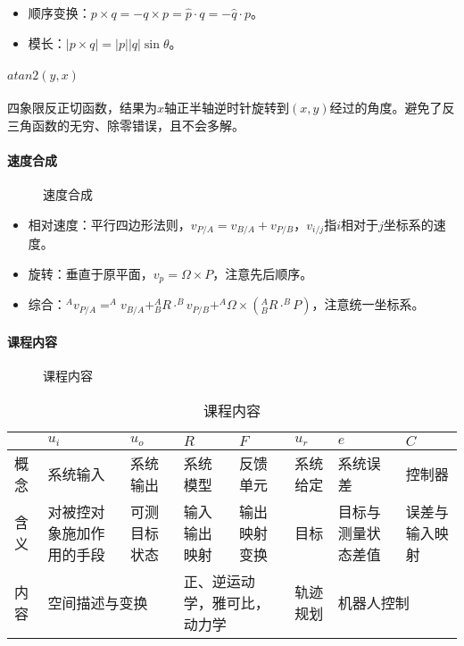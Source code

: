 \documentclass[
12pt, %
a4paper, 
oneside, %
headinclude,footinclude, %
]{scrartcl}
\begin{document}
\begin{itemize}
\item 顺序变换：$ p \times q = -q \times p = \hat{p} \cdot q = -\hat{q} \cdot p $。
\item 模长：$ |p \times q| = |p||q|\sin\theta $。
\end{itemize}
\paragraph{$ atan2(y, x) $}
四象限反正切函数，结果为$ x $轴正半轴逆时针旋转到$ (x, y) $经过的角度。避免了反三角函数的无穷、除零错误，且不会多解。
\paragraph{速度合成}
\begin{figure}[H]
\centering
{} \quad
{}
\caption{速度合成}
\end{figure}

\begin{itemize}
\item 相对速度：平行四边形法则，$ v_{P/A} = v_{B/A} + v_{P/B} $，$ v_{i/j} $指$ i $相对于$ j $坐标系的速度。
\item 旋转：垂直于原平面，$ v_p = \Omega \times P $，注意先后顺序。
\item 综合：$ ^A v_{P/A} = ^A v_{B/A} + ^A_B R \cdot ^B v_{P/B} + ^A \Omega \times (^A_B R \cdot ^B P) $，注意统一坐标系。
\end{itemize}
\paragraph{课程内容}
\begin{figure}[H]
\centering
{} \quad
{}
\caption{课程内容}
\end{figure}

\begin{table}[H]
\centering
\begin{tabular}{|p{0.9cm}|p{2cm}|p{2cm}|p{2cm}|p{2cm}|p{2cm}|p{2cm}|p{2cm}|}
\hline
& $ u_i $ & $ u_o $ & $ R $ & $ F $ & $ u_r $ & $ e $ & $ C $ \\
\hline
概念 & 系统输入 & 系统输出 & 系统模型 & 反馈单元 & 系统给定 & 系统误差 & 控制器 \\
\hline
含义 & 对被控对象施加作用的手段 & 可测目标状态 & 输入输出映射 & 输出映射变换 & 目标 & 目标与测量状态差值 & 误差与输入映射 \\
\hline
内容 & \multicolumn{2}{l|}{空间描述与变换} & \multicolumn{2}{p{4cm}|}{正、逆运动学，雅可比，动力学} & 轨迹规划 & \multicolumn{2}{l|}{机器人控制} \\
\hline
\end{tabular}
\caption{课程内容}
\end{table}
\end{document}

